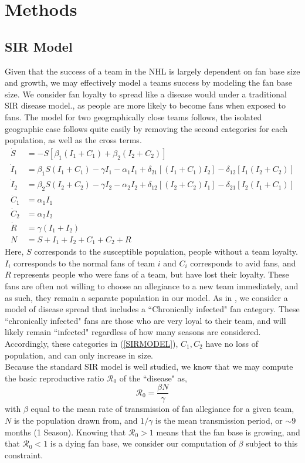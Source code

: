 \documentclass[11pt]{report}            %
\newcommand{\ro}{\mathcal{R}_0}
\begin{document}
\section*{Methods}
\subsection*{SIR Model}
Given that the success of a team in the NHL is largely dependent on fan base size and growth, we may effectively model a teams success by modeling the fan base size. We consider fan loyalty to spread like a disease would under a traditional SIR disease model.\cite{light}, as people are more likely to become fans when exposed to fans. The model for two geographically close teams follows, the isolated geographic case follows quite easily by removing the second categories for each population, as well as the cross terms.
\begin{equation} \label{SIRMODEL}
\begin{split}
\dot{S} &= -S[\beta_1(I_1+C_1)+\beta_2(I_2+C_2)]\\
\dot{I}_1 &= \beta_1S(I_1+C_1)-\gamma I_1-\alpha_1I_1+\delta_{21}[(I_1+C_1)I_2]-\delta_{12}[I_1(I_2+C_2)]\\
\dot{I}_2 &= \beta_2S(I_2+C_2)-\gamma I_2-\alpha_2I_2+\delta_{12}[(I_2+C_2)I_1]-\delta_{21}[I_2(I_1+C_1)]\\
\dot{C}_1 &= \alpha_1I_1\\
\dot{C}_2 &= \alpha_2I_2\\
\dot{R} &= \gamma (I_1+I_2)\\
N &= S+I_1+I_2+C_1+C_2+R
\end{split}
\end{equation}
Here, $S$ corresponds to the susceptible population, people without a team loyalty. $I_i$ corresponds to the normal fans of team $i$ and $C_i$ corresponds to avid fans, and $R$ represents people who were fans of a team, but have lost their loyalty. These fans are often not willing to choose an allegiance to a new team immediately, and as such, they remain a separate population in our model. As in \cite{light}, we consider a model of disease spread that includes a ``Chronically infected" fan category. These ``chronically infected" fans are those who are very loyal to their team, and will likely remain ``infected" regardless of how many seasons are considered. Accordingly, these categories in (\ref{SIRMODEL}), $C_1,C_2$ have no loss of population, and can only increase in size. \\
Because the standard SIR model is well studied, we know that we may compute the basic reproductive ratio $\ro$ of the ``disease" as,
\[\ro =\frac{\beta N}{\gamma}\]
with $\beta$ equal to the mean rate of transmission of fan allegiance for a given team, $N$ is the population drawn from, and $1/\gamma$ is the mean transmission period, or $\sim 9$ months (1 Season). Knowing that $\ro>1$ means that the fan base is growing, and that $\ro<1$ is a dying fan base, we consider our computation of $\beta$ subject to this constraint.
\end{document}
